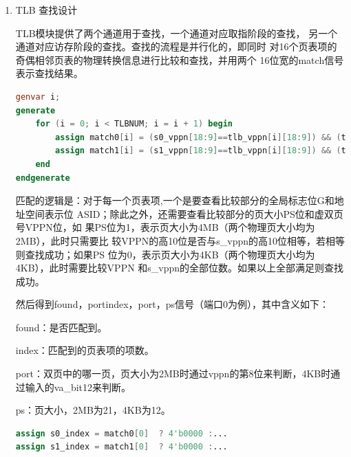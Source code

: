 \documentclass[11pt]{article}
\begin{document}
\begin{enumerate}
\begin{lstlisting}[language=verilog]
    assign inv_match = (invtlb_op == 5'h0 || invtlb_op == 5'h1) ? (cond1 | cond2):
    invtlb_op == 5'h2 ? cond2:
    invtlb_op == 5'h3 ? cond1:
    invtlb_op == 5'h4 ? cond1 & cond3:
    invtlb_op == 5'h5 ? cond1 & cond3 & cond4:
    (cond2 | cond3) & cond4;
  \end{lstlisting}
  在invtlb指令有效时，根据输入的opcode选择inv_match，
  将inv_match对应位为1的页表项无效化（e值清零），为0的页表项不变：
  \begin{lstlisting}[language=verilog]
    else if(invtlb_valid && invtlb_op < 5'h7)
    begin
        tlb_e               <= ~inv_match & tlb_e;
    end
  \end{lstlisting}
  \item TLB 查找设计\par
  TLB模块提供了两个通道用于查找，一个通道对应取指阶段的查找，
  另一个通道对应访存阶段的查找。查找的流程是并行化的，即同时
  对16个页表项的奇偶相邻页表的物理转换信息进行比较和查找，并用两个
  16位宽的match信号表示查找结果。\par
  \begin{lstlisting}[language=verilog]
    genvar i;
generate
    for (i = 0; i < TLBNUM; i = i + 1) begin
        assign match0[i] = (s0_vppn[18:9]==tlb_vppn[i][18:9]) && (tlb_ps4MB[i] || s0_vppn[8:0]==tlb_vppn[i][8:0]) && ((s0_asid==tlb_asid[i]) || tlb_g[i]);
        assign match1[i] = (s1_vppn[18:9]==tlb_vppn[i][18:9]) && (tlb_ps4MB[i] || s1_vppn[8:0]==tlb_vppn[i][8:0]) && ((s1_asid==tlb_asid[i]) || tlb_g[i]);
    end
endgenerate
  \end{lstlisting}
  匹配的逻辑是：对于每一个页表项,一个是要查看比较部分的全局标志位G和地址空间表示位
  ASID；除此之外，还需要查看比较部分的页大小PS位和虚双页号VPPN位，如
  果PS位为1，表示页大小为4MB（两个物理页大小均为2MB），此时只需要比
  较VPPN的高10位是否与s_vppn的高10位相等，若相等则查找成功；如果PS
  位为0，表示页大小为4KB（两个物理页大小均为4KB），此时需要比较VPPN
  和s_vppn的全部位数。如果以上全部满足则查找成功。\par

  然后得到found，portindex，port，ps信号（端口0为例），其中含义如下：\par
  found：是否匹配到。\par
  index：匹配到的页表项的项数。\par
  port：双页中的哪一页，页大小为2MB时通过vppn的第8位来判断，4KB时通过输入的va_bit12来判断。\par
  ps：页大小，2MB为21，4KB为12。\par
  \begin{lstlisting}[language=verilog]
assign s0_index = match0[0]  ? 4'b0000 :...    
assign s1_index = match1[0]  ? 4'b0000 :...
                 

\end{lstlisting}
\end{enumerate}
\end{document}

